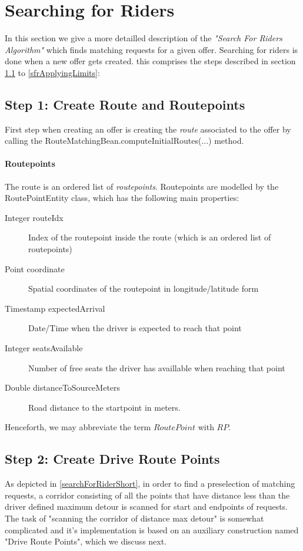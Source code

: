 \chapter{Searching for Riders}
\label{searchForRiders}
In this section we give a more detailled description of the \emph{"Search For Riders Algorithm"}
which finds matching requests for a given offer.
Searching for riders is done when a new offer gets created. this comprises the 
steps described in section \ref{sfrCreatingRoute} to \ref{sfrApplyingLimits}:


\section{Step 1: Create Route and Routepoints}
\label{sfrCreatingRoute}

First step when creating an offer is creating the \emph{route} associated to the offer
by calling the RouteMatchingBean.computeInitialRoutes(...) method.
\subsubsection{Routepoints}
The route is an ordered list of \emph{routepoints}. Routepoints are modelled by the 
RoutePointEntity class, which has the following main properties:
\begin{description}
     	 \item[Integer routeIdx]{Index of the routepoint inside the route (which is an ordered list of routepoints)} 
	 \item[Point coordinate]{Spatial coordinates of the routepoint in longitude/latitude form} 
  	 \item[Timestamp expectedArrival]{Date/Time when the driver is expected to reach that point}     
    	 \item[Integer seatsAvailable]{Number of free seats the driver has availlable when reaching that point} 
	 \item[Double distanceToSourceMeters]{Road distance to the startpoint in meters.} 
\end{description}

Henceforth, we may abbreviate the term $RoutePoint$ with $RP$.
\section{Step 2: Create Drive Route Points}
\label{sfrScanningTheCorridor}
As depicted in \ref{searchForRiderShort}, in order to find a preselection of matching requests,
a corridor consisting of all the points that have distance less than the driver defined maximum detour 
is scanned for start and endpoints of requests.
The task of "scanning the corridor of distance max detour" is somewhat complicated and it's 
implementation is based on an auxiliary construction named "Drive Route Points", which we discuss next.
